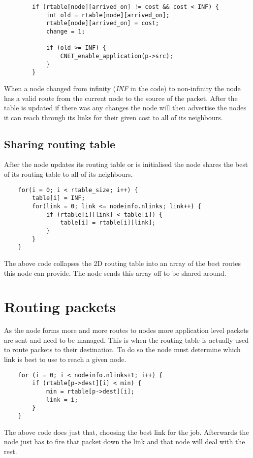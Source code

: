 \documentclass[12pt]{article}
\begin{document}
\begin{verbatim}
        if (rtable[node][arrived_on] != cost && cost < INF) {
            int old = rtable[node][arrived_on];
            rtable[node][arrived_on] = cost;
            change = 1;

            if (old >= INF) {
                CNET_enable_application(p->src);
            }
        }
\end{verbatim}

When a node changed from infinity (\emph{INF} in the code) to non-infinity the
node has a valid route from the current node to the source of the packet. After
the table is updated if there was any changes the node will then advertise the
nodes it can reach through its links for their given cost to all of its
neighbours.

\subsection*{Sharing routing table}

After the node updates its routing table or is initialised the node shares the
best of its routing table to all of its neighbours.

\begin{verbatim}
    for(i = 0; i < rtable_size; i++) {
        table[i] = INF;
        for(link = 0; link <= nodeinfo.nlinks; link++) {
            if (rtable[i][link] < table[i]) {
                table[i] = rtable[i][link];
            }
        }
    }
\end{verbatim}

The above code collapses the 2D routing table into an array of the best routes
this node can provide. The node sends this array off to be shared around.

\section*{Routing packets}

As the node forms more and more routes to nodes more application level packets
are sent and need to be managed. This is when the routing table is actually
used to route packets to their destination. To do so the node must determine
which link is best to use to reach a given node.

\begin{verbatim}
    for (i = 0; i < nodeinfo.nlinks+1; i++) {
        if (rtable[p->dest][i] < min) {
            min = rtable[p->dest][i];
            link = i;
        }
    }
\end{verbatim}

The above code does just that, choosing the best link for the job. Afterwards
the node just has to fire that packet down the link and that node will deal
with the rest.
\end{document}
